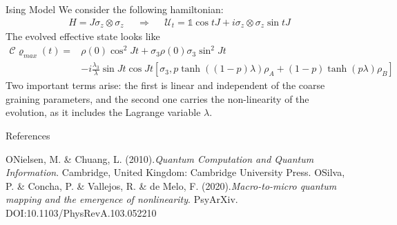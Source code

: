 \documentclass{cubeamer}
\newcommand{\mcU}{\mathcal{U}}
\newcommand{\mcC}{\mathcal{C}}
\newcommand{\Id}{\mathds{1}}%
\begin{document}
\begin{frame}{Ising Model}
    We consider the following hamiltonian:
    \begin{align*}
        H=J\sigma_{z}\otimes\sigma_{z} && \Rightarrow && \mcU_{t}=\Id \cos{tJ} + i\sigma_{z}\otimes\sigma_{z}\sin{tJ}
    \end{align*}
    The evolved effective state looks like
    \begin{align*}
        \mcC{\varrho_{max}(t)}=&\rho(0)\cos^{2}{Jt}+\sigma_{3}\rho(0)\sigma_{3}\sin^{2}{Jt}\\
        &-i\frac{\lambda_{3}}{\lambda}\sin{Jt}\cos{Jt}[\sigma_{3},p\tanh((1-p)\lambda)\rho_{A}+(1-p)\tanh(p\lambda)\rho_{B}]
    \end{align*}
    Two important terms arise: the first is linear and independent of the coarse graining parameters, and the second one carries the non-linearity of the evolution, as it includes the Lagrange variable $\lambda$.
\end{frame}
\appendix

\begin{frame}{References}
\begin{thebibliography}{99}
\bibitem ONielsen, M. \& Chuang, L. (2010).\textit{Quantum Computation and Quantum Information}. Cambridge, United Kingdom: Cambridge University Press.
\bibitem OSilva, P. \& Concha, P. \& Vallejos, R. \& de Melo, F. (2020).\textit{Macro-to-micro quantum mapping and the emergence of nonlinearity}. PsyArXiv. DOI:10.1103/PhysRevA.103.052210
\end{thebibliography}
\end{frame}
\end{document}
